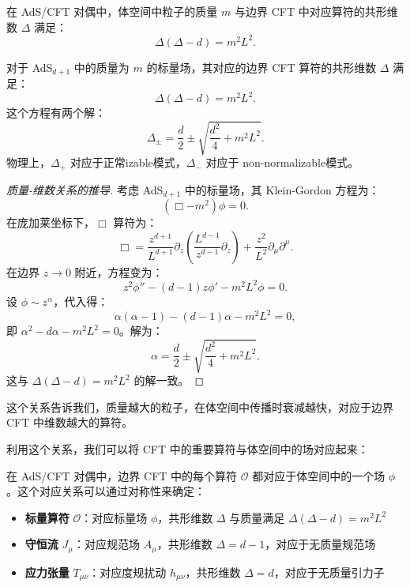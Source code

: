 在 AdS/CFT 对偶中，体空间中粒子的质量 $m$ 与边界 CFT 中对应算符的共形维数 $\Delta$ 满足：
\begin{equation}
    \Delta(\Delta - d) = m^2 L^2.
\end{equation}

\begin{theorem}[质量-维数关系]
对于 AdS$_{d+1}$ 中的质量为 $m$ 的标量场，其对应的边界 CFT 算符的共形维数 $\Delta$ 满足：
\begin{equation}
    \Delta(\Delta - d) = m^2 L^2.
\end{equation}
这个方程有两个解：
\begin{equation}
    \Delta_{\pm} = \frac{d}{2} \pm \sqrt{\frac{d^2}{4} + m^2 L^2}.
\end{equation}
物理上，$\Delta_+$ 对应于正常izable模式，$\Delta_-$ 对应于 non-normalizable模式。
\end{theorem}

\begin{proof}[质量-维数关系的推导]
考虑 AdS$_{d+1}$ 中的标量场，其 Klein-Gordon 方程为：
\begin{equation}
    (\Box - m^2) \phi = 0.
\end{equation}
在庞加莱坐标下，$\Box$ 算符为：
\begin{equation}
    \Box = \frac{z^{d+1}}{L^{d+1}} \partial_z \left( \frac{L^{d-1}}{z^{d-1}} \partial_z \right) + \frac{z^2}{L^2} \partial_\mu \partial^\mu.
\end{equation}
在边界 $z \to 0$ 附近，方程变为：
\begin{equation}
    z^2 \phi'' - (d-1) z \phi' - m^2 L^2 \phi = 0.
\end{equation}
设 $\phi \sim z^\alpha$，代入得：
\begin{equation}
    \alpha(\alpha - 1) - (d-1)\alpha - m^2 L^2 = 0,
\end{equation}
即 $\alpha^2 - d\alpha - m^2 L^2 = 0$。解为：
\begin{equation}
    \alpha = \frac{d}{2} \pm \sqrt{\frac{d^2}{4} + m^2 L^2}.
\end{equation}
这与 $\Delta(\Delta - d) = m^2 L^2$ 的解一致。
\end{proof}

这个关系告诉我们，质量越大的粒子，在体空间中传播时衰减越快，对应于边界 CFT 中维数越大的算符。

利用这个关系，我们可以将 CFT 中的重要算符与体空间中的场对应起来：

\begin{theorem}
在 AdS/CFT 对偶中，边界 CFT 中的每个算符 $\mathcal{O}$ 都对应于体空间中的一个场 $\phi$。这个对应关系可以通过对称性来确定：
\begin{itemize}
    \item \textbf{标量算符} $\mathcal{O}$：对应标量场 $\phi$，共形维数 $\Delta$ 与质量满足 $\Delta(\Delta-d) = m^2 L^2$
    \item \textbf{守恒流} $J_\mu$：对应规范场 $A_\mu$，共形维数 $\Delta = d-1$，对应于无质量规范场
    \item \textbf{应力张量} $T_{\mu\nu}$：对应度规扰动 $h_{\mu\nu}$，共形维数 $\Delta = d$，对应于无质量引力子
\end{itemize}
\end{theorem}

